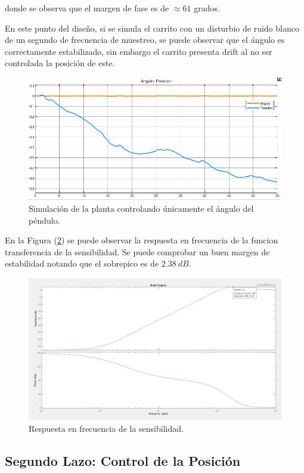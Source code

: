 donde se observa que el margen de fase es de $\approx 61$ grados.

En este punto del diseño, si se simula el carrito con un disturbio de ruido blanco de un segundo de frecuencia de muestreo, se puede observar que el ángulo es correctamente estabilizado, sin embargo el carrito presenta drift al no ser controlada la posición de este.

\begin{figure}[H]
	\centering
	\includegraphics[width=0.8\linewidth]{Imagenes/loopshaping/simulacion_solo_angulo}
	\caption{Simulación de la planta controlando únicamente el ángulo del péndulo.}
	\label{simulacion_solo_angulo}
\end{figure}

En la Figura (\ref{s_q}) se puede observar la respuesta en frecuencia de la funcion transferencia de la sensibilidad. Se puede comprobar un buen margen de estabilidad notando que el sobrepico es de $2.38 \ dB$.

\begin{figure}[H]
	\centering
	\includegraphics[width=0.8\linewidth]{Imagenes/loopshaping/bode_s_q}
	\caption{Respuesta en frecuencia de la sensibilidad.}
	\label{s_q}
\end{figure}

\subsection{Segundo Lazo: Control de la Posición}

